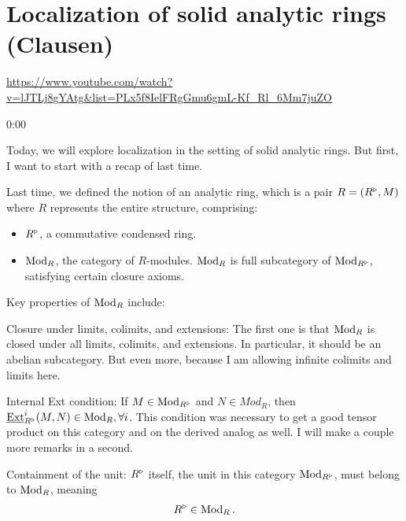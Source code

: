 
\section{\ufs Localization of solid analytic rings (Clausen)}

\url{https://www.youtube.com/watch?v=lJTLj8gYAtg&list=PLx5f8IelFRgGmu6gmL-Kf_Rl_6Mm7juZO}
\renewcommand{\yt}[2]{\href{https://www.youtube.com/watch?v=lJTLj8gYAtg&list=PLx5f8IelFRgGmu6gmL-Kf_Rl_6Mm7juZO&t=#1}{#2}}
\vspace{1em}

\begin{unfinished}{0:00}

Today, we will explore localization in the setting of solid analytic rings. But first, I want to start with a recap of last time.

Last time, we defined the notion of an analytic ring, which is a pair $R = (R^\triangleright, M)$ where $R$ represents the entire structure, comprising: 
\begin{itemize}
\item $R^\triangleright$, a commutative condensed ring.
\item $\operatorname{Mod}_R$, the category of $R$-modules. $\operatorname{Mod}_R$ is full subcategory of $\operatorname{Mod}_{R^\triangleright}$, satisfying certain closure axioms. 
\end{itemize}

Key properties of $\operatorname{Mod}_R$  include:
\bit
\item Closure under limits, colimits, and extensions: The first one is that $\operatorname{Mod}_R$ is closed under all limits, colimits, and extensions. In particular, it should be an abelian subcategory. But even more, because I am allowing infinite colimits and limits here.
\item Internal Ext condition: If $M \in \operatorname{Mod}_{R^\triangleright}$ and $N \in Mod_R$, then $\operatorname{\underline{Ext}}^i_{R^\triangleright}(M,N) \in \operatorname{Mod}_R, \forall i$. This condition was necessary to get a good tensor product on this category and on the derived analog as well. I will make a couple more remarks in a second.
\item Containment of the unit: $R^\triangleright$ itself, the unit in this category $\operatorname{Mod}_{R^\triangleright}$, must belong to $\operatorname{Mod}_R$, meaning 
\begin{align*}
R^\triangleright \in \operatorname{Mod}_R.
\end{align*}

\eit



\end{unfinished}
